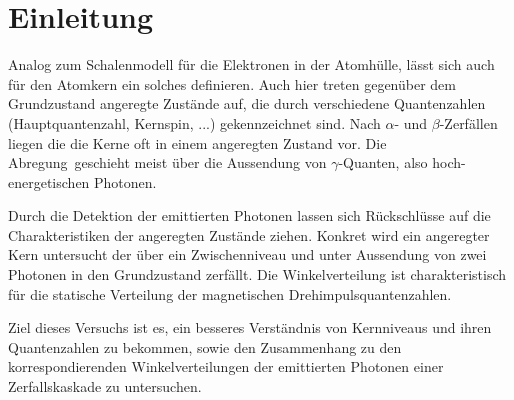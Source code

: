 \section{Einleitung}

Analog zum Schalenmodell für die Elektronen in der Atomhülle, lässt sich auch für den Atomkern ein solches definieren.
Auch hier treten gegenüber dem Grundzustand angeregte Zustände auf, die durch verschiedene Quantenzahlen (Hauptquantenzahl, Kernspin, ...) gekennzeichnet sind. Nach $\alpha$- und $\beta$-Zerfällen liegen die die Kerne oft in einem angeregten Zustand vor.
Die \glqq Abregung\grqq\ geschieht meist über die Aussendung von $\gamma$-Quanten, also hoch-energetischen Photonen.

Durch die Detektion der emittierten Photonen lassen sich Rückschlüsse auf die Charakteristiken der angeregten Zustände ziehen. Konkret wird ein angeregter Kern untersucht der über ein Zwischenniveau und unter Aussendung von zwei Photonen in den Grundzustand zerfällt. Die Winkelverteilung ist charakteristisch für die statische Verteilung der magnetischen Drehimpulsquantenzahlen.

Ziel dieses Versuchs ist es, ein besseres Verständnis von Kernniveaus und ihren Quantenzahlen zu bekommen, sowie den Zusammenhang zu den korrespondierenden Winkelverteilungen der emittierten Photonen einer Zerfallskaskade zu untersuchen.


